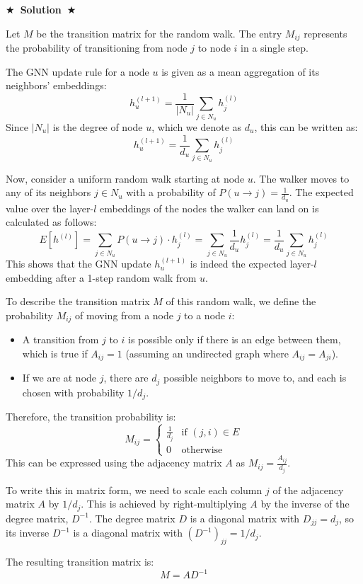 \documentclass{article}
\numberwithin{figure}{section}
\newcommand{\Solution}[1]{%
	{%
		\medskip
		\color{red}
		\bf $\bigstar$~\sf\textbf{Solution}~$\bigstar$ \sf
		#1
	}
	\bigskip
}
\begin{document}
	\Solution{
		Let $M$ be the transition matrix for the random walk. The entry $M_{ij}$ represents the probability of transitioning from node $j$ to node $i$ in a single step.
		
		The GNN update rule for a node $u$ is given as a mean aggregation of its neighbors' embeddings:
		\[ h^{(l+1)}_u = \frac{1}{|N_u|} \sum_{j \in N_u} h^{(l)}_j \]
		Since $|N_u|$ is the degree of node $u$, which we denote as $d_u$, this can be written as:
		\[ h^{(l+1)}_u = \frac{1}{d_u} \sum_{j \in N_u} h^{(l)}_j \]
		
		Now, consider a uniform random walk starting at node $u$. The walker moves to any of its neighbors $j \in N_u$ with a probability of $P(u \to j) = \frac{1}{d_u}$. The expected value over the layer-$l$ embeddings of the nodes the walker can land on is calculated as follows:
		\[ E[h^{(l)}] = \sum_{j \in N_u} P(u \to j) \cdot h^{(l)}_j = \sum_{j \in N_u} \frac{1}{d_u} h^{(l)}_j = \frac{1}{d_u} \sum_{j \in N_u} h^{(l)}_j \]
		This shows that the GNN update $h^{(l+1)}_u$ is indeed the expected layer-$l$ embedding after a 1-step random walk from $u$.
		
		To describe the transition matrix $M$ of this random walk, we define the probability $M_{ij}$ of moving from a node $j$ to a node $i$:
		\begin{itemize}
			\item A transition from $j$ to $i$ is possible only if there is an edge between them, which is true if $A_{ij} = 1$ (assuming an undirected graph where $A_{ij} = A_{ji}$).
			\item If we are at node $j$, there are $d_j$ possible neighbors to move to, and each is chosen with probability $1/d_j$.
		\end{itemize}
		Therefore, the transition probability is:
		\[ M_{ij} = \begin{cases} 
			\frac{1}{d_j} & \text{if } (j,i) \in E \\
			0 & \text{otherwise} 
		\end{cases}
		\]
		This can be expressed using the adjacency matrix $A$ as $M_{ij} = \frac{A_{ij}}{d_j}$.
		
		To write this in matrix form, we need to scale each column $j$ of the adjacency matrix $A$ by $1/d_j$. This is achieved by right-multiplying $A$ by the inverse of the degree matrix, $D^{-1}$. The degree matrix $D$ is a diagonal matrix with $D_{jj} = d_j$, so its inverse $D^{-1}$ is a diagonal matrix with $(D^{-1})_{jj} = 1/d_j$.
		
		The resulting transition matrix is:
		\[ M = A D^{-1} \]
	}
	
\end{document}
